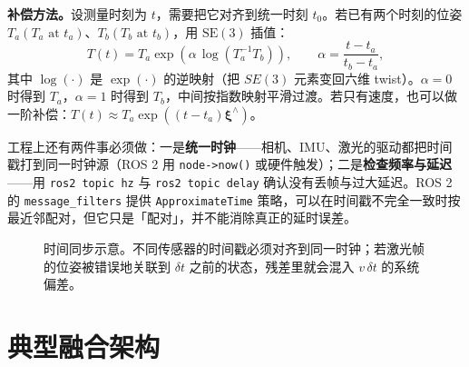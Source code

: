 \textbf{补偿方法。}设测量时刻为 $t$，需要把它对齐到统一时刻 $t_0$。若已有两个时刻的位姿 $T_a(T_a\text{ at }t_a)$、$T_b(T_b\text{ at }t_b)$，用 $\mathrm{SE}(3)$ 插值：
\begin{equation}
  T(t) = T_a\exp\left(\alpha\,\log\left(T_a^{-1}T_b\right)\right),
  \qquad
  \alpha=\frac{t-t_a}{t_b-t_a},
  \label{eq:09-interp}
\end{equation}
其中 $\log(\cdot)$ 是 $\exp(\cdot)$ 的逆映射（把 $SE(3)$ 元素变回六维 twist）。$\alpha=0$ 时得到 $T_a$，$\alpha=1$ 时得到 $T_b$，中间按指数映射平滑过渡。若只有速度，也可以做一阶补偿：$T(t)\approx T_a\exp((t-t_a)\bm{\xi}^{\wedge})$。

工程上还有两件事必须做：一是\textbf{统一时钟}——相机、IMU、激光的驱动都把时间戳打到同一时钟源（ROS 2 用 \texttt{node->now()} 或硬件触发）；二是\textbf{检查频率与延迟}——用 \texttt{ros2 topic hz} 与 \texttt{ros2 topic delay} 确认没有丢帧与过大延迟。ROS 2 的 \texttt{message\_filters} 提供 \texttt{ApproximateTime} 策略，可以在时间戳不完全一致时按最近邻配对，但它只是「配对」，并不能消除真正的延时误差。

\begin{figure}[htbp]
  \centering
  \caption{时间同步示意。不同传感器的时间戳必须对齐到同一时钟；若激光帧的位姿被错误地关联到 $\delta t$ 之前的状态，残差里就会混入 $v\,\delta t$ 的系统偏差。}
  \label{fig:09-time}
\end{figure}

\section{典型融合架构}\label{sec:09-arch}

